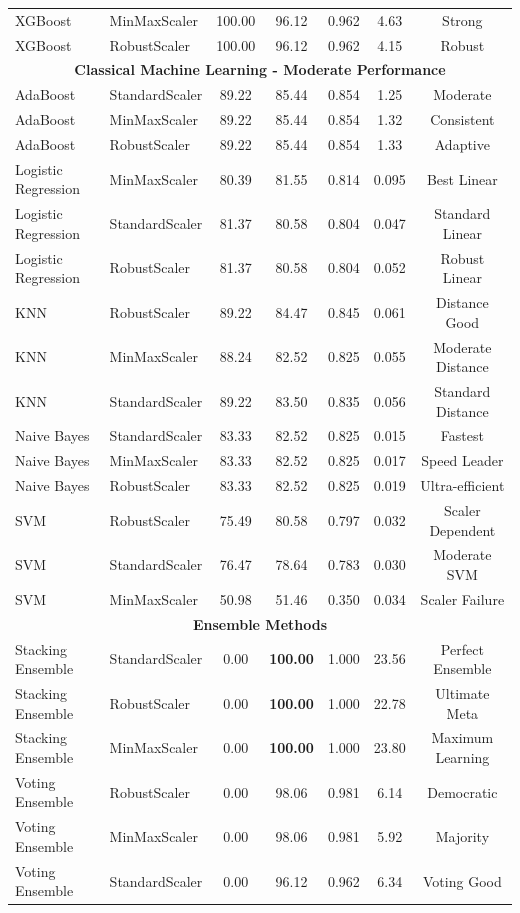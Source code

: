 \begin{table}[H]
{\begin{tabular}{|l|l|c|c|c|c|c|}
XGBoost & MinMaxScaler & 100.00 & 96.12 & 0.962 & 4.63 & Strong \\
XGBoost & RobustScaler & 100.00 & 96.12 & 0.962 & 4.15 & Robust \\
\hline
\multicolumn{7}{|c|}{\textbf{Classical Machine Learning - Moderate Performance}} \\
\hline
AdaBoost & StandardScaler & 89.22 & 85.44 & 0.854 & 1.25 & Moderate \\
AdaBoost & MinMaxScaler & 89.22 & 85.44 & 0.854 & 1.32 & Consistent \\
AdaBoost & RobustScaler & 89.22 & 85.44 & 0.854 & 1.33 & Adaptive \\
Logistic Regression & MinMaxScaler & 80.39 & 81.55 & 0.814 & 0.095 & Best Linear \\
Logistic Regression & StandardScaler & 81.37 & 80.58 & 0.804 & 0.047 & Standard Linear \\
Logistic Regression & RobustScaler & 81.37 & 80.58 & 0.804 & 0.052 & Robust Linear \\
KNN & RobustScaler & 89.22 & 84.47 & 0.845 & 0.061 & Distance Good \\
KNN & MinMaxScaler & 88.24 & 82.52 & 0.825 & 0.055 & Moderate Distance \\
KNN & StandardScaler & 89.22 & 83.50 & 0.835 & 0.056 & Standard Distance \\
Naive Bayes & StandardScaler & 83.33 & 82.52 & 0.825 & 0.015 & Fastest \\
Naive Bayes & MinMaxScaler & 83.33 & 82.52 & 0.825 & 0.017 & Speed Leader \\
Naive Bayes & RobustScaler & 83.33 & 82.52 & 0.825 & 0.019 & Ultra-efficient \\
SVM & RobustScaler & 75.49 & 80.58 & 0.797 & 0.032 & Scaler Dependent \\
SVM & StandardScaler & 76.47 & 78.64 & 0.783 & 0.030 & Moderate SVM \\
SVM & MinMaxScaler & 50.98 & 51.46 & 0.350 & 0.034 & Scaler Failure \\
\hline
\multicolumn{7}{|c|}{\textbf{Ensemble Methods}} \\
\hline
Stacking Ensemble & StandardScaler & 0.00 & \textbf{100.00} & 1.000 & 23.56 & Perfect Ensemble \\
Stacking Ensemble & RobustScaler & 0.00 & \textbf{100.00} & 1.000 & 22.78 & Ultimate Meta \\
Stacking Ensemble & MinMaxScaler & 0.00 & \textbf{100.00} & 1.000 & 23.80 & Maximum Learning \\
Voting Ensemble & RobustScaler & 0.00 & 98.06 & 0.981 & 6.14 & Democratic \\
Voting Ensemble & MinMaxScaler & 0.00 & 98.06 & 0.981 & 5.92 & Majority \\
Voting Ensemble & StandardScaler & 0.00 & 96.12 & 0.962 & 6.34 & Voting Good \\
\hline
\end{tabular}%
}
\end{table}

